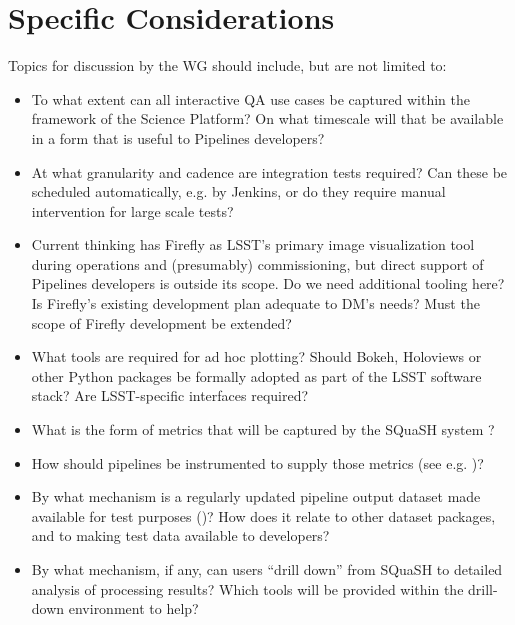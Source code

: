 \documentclass[DM,toc]{lsstdoc}
\begin{document}
\section{Specific Considerations}

Topics for discussion by the WG should include, but are not limited to:

\begin{itemize}

  \item{To what extent can all interactive QA use cases be captured within the
  framework of the Science Platform? On what timescale will that be available
  in a form that is useful to Pipelines developers?}

  \item{At what granularity and cadence are integration tests required? Can
  these be scheduled automatically, e.g. by Jenkins, or do they require manual
  intervention for large scale tests?}

  \item{Current thinking has Firefly as LSST's primary image visualization
  tool during operations and (presumably) commissioning, but direct support of
  Pipelines developers is outside its scope. Do we need additional tooling
  here? Is Firefly's existing development plan adequate to DM's needs? Must
  the scope of Firefly development be extended?}

  \item{What tools are required for ad hoc plotting? Should Bokeh, Holoviews
  or other Python packages be formally adopted as part of the LSST software
  stack? Are LSST-specific interfaces required?}

  \item{What is the form of metrics that will be captured by the SQuaSH system
  ?}

  \item{How should pipelines be instrumented to supply those metrics (see e.g.
  )?}

  \item{By what mechanism is a regularly updated pipeline output dataset made
  available for test purposes ()? How does it relate to other
  dataset packages, and to making test data available to developers?}

  \item{By what mechanism, if any, can users ``drill down'' from SQuaSH to
  detailed analysis of processing results? Which tools will be provided within
  the drill-down environment to help?}

\end{itemize}
\end{document}
